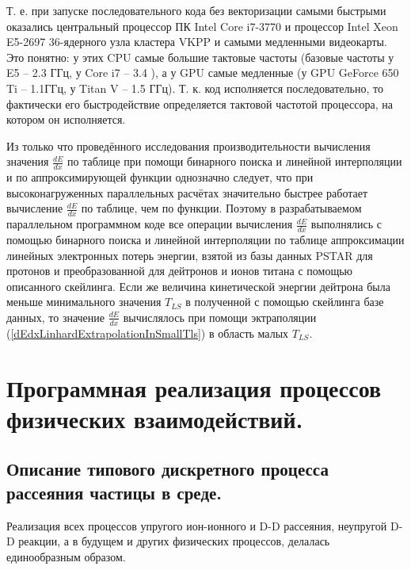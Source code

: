 \documentclass[a4paper,12pt]{article}
\begin{document}
\begin{large}
	Т. е. при запуске последовательного кода без векторизации самыми быстрыми оказались центральный процессор ПК Intel Core i7-3770 и процессор Intel Xeon E5-2697 36-ядерного узла кластера VKPP и самыми медленными видеокарты.
	Это понятно: у этих CPU самые большие тактовые частоты (базовые частоты у E5 – 2.3 ГГц, у Core i7 – 3.4 ), а у GPU самые медленные (у GPU GeForce 650 Ti -- 1.1ГГц, у Titan V -- 1.5 ГГц).
	Т. к. код исполняется последовательно, то фактически его быстродействие определяется тактовой частотой процессора, на котором он исполняется.
	
	Из только что проведённого исследования производительности вычисления значения $
\frac{dE}{dx}$ по таблице при помощи бинарного поиска и линейной интерполяции и по аппроксимирующей функции однозначно следует, что при высоконагруженных параллельных расчётах значительно быстрее работает вычисление $\frac{dE}{dx}$ по таблице, чем по функции.
	Поэтому в разрабатываемом параллельном программном коде все операции вычисления $\frac{dE}{dx}$ выполнялись с помощью бинарного поиска и линейной интерполяции по таблице аппроксимации линейных электронных потерь энергии, взятой из базы данных PSTAR для протонов и преобразованной для дейтронов и ионов титана с помощью описанного скейлинга.
	Если же величина кинетической энергии дейтрона была меньше минимального значения $T_{LS}$ в полученной с помощью скейлинга базе данных, то значение $\frac{dE}{dx}$ вычислялось при помощи эктраполяции (\ref{dEdxLinhardExtrapolationInSmallTls}) в область малых $T_{LS}$.

  
  

\clearpage{}
\section{Программная реализация процессов физических взаимодействий.}
\subsection{Описание типового дискретного процесса рассеяния частицы в среде.}
\label{TypicalPhysicalProcessDescription}

	Реализация всех процессов упругого ион-ионного и D-D рассеяния, неупругой D-D реакции, а в будущем и других физических процессов, делалась единообразным образом.
	

\end{large}
\end{document}
